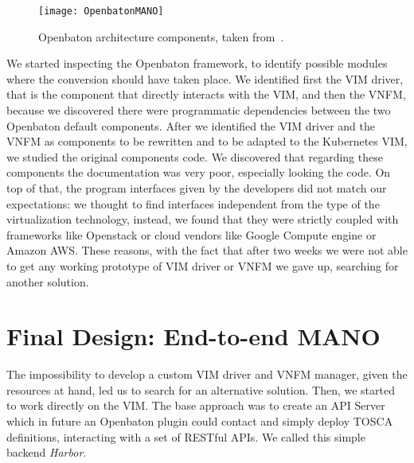 \begin{figure}[t]
  \centering
  \texttt{[image: OpenbatonMANO]}
  \caption[Openbaton architecture components]{Openbaton architecture components,
    taken from~\cite{openbatondocumentation}.}
  \label{chap:archimpl:sec:secondattempt:img:openbatonMANO}
\end{figure}

We started inspecting the Openbaton framework, to identify possible modules
where the conversion should have taken place. We identified first the VIM
driver, that is the component that directly interacts with the VIM, and then the
VNFM, because we discovered there were programmatic dependencies between the two
Openbaton default components. After we identified the VIM driver and the VNFM as
components to be rewritten and to be adapted to the Kubernetes VIM, we studied
the original components code. We discovered that regarding these components the
documentation was very poor, especially looking the code. On top of that, the
program interfaces given by the developers did not match our expectations: we
thought to find interfaces independent from the type of the virtualization
technology, instead, we found that they were strictly coupled with frameworks
like Openstack or cloud vendors like Google Compute engine or Amazon AWS. These
reasons, with the fact that after two weeks we were not able to get any working
prototype of VIM driver or VNFM we gave up, searching for another solution.

\section{Final Design: End-to-end MANO}

The impossibility to develop a custom VIM driver and VNFM manager, given the
resources at hand, led us to search for an alternative solution. Then, we
started to work directly on the VIM. The base approach was to create an API
Server which in future an Openbaton plugin could contact and simply deploy TOSCA
definitions, interacting with a set of RESTful APIs. We called this simple
backend \emph{Harbor}.

